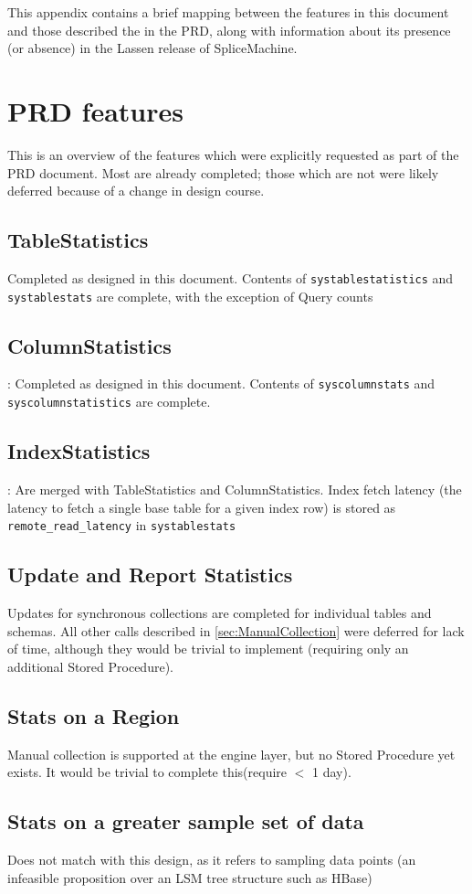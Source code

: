 This appendix contains a brief mapping between the features in this document and those described the in the PRD, along with information about its presence (or absence) in the Lassen release of SpliceMachine.

\section{PRD features}
This is an overview of the features which were explicitly requested as part of the PRD document. Most are already completed; those which are not were likely deferred because of a change in design course.
\subsection{TableStatistics} 
	Completed as designed in this document. Contents of \texttt{systablestatistics} and \texttt{systablestats} are complete, with the exception of Query counts
\subsection{ColumnStatistics}: Completed as designed in this document. Contents of \texttt{syscolumnstats} and \texttt{syscolumnstatistics} are complete.
\subsection{IndexStatistics}: Are merged with TableStatistics and ColumnStatistics. Index fetch latency (the latency to fetch a single base table for a given index row) is stored as \texttt{remote\_read\_latency} in \texttt{systablestats}
\subsection{Update and Report Statistics}
Updates for synchronous collections are completed for individual tables and schemas. All other calls described in \ref{sec:ManualCollection} were deferred for lack of time, although they would be trivial to implement (requiring only an additional Stored Procedure).
\subsection{Stats on a Region} Manual collection is supported at the engine layer, but no Stored Procedure yet exists. It would be trivial to complete this(require $<$ 1 day).
\subsection{Stats on a greater sample set of data} Does not match with this design, as it refers to sampling data points (an infeasible proposition over an LSM tree structure such as HBase)
